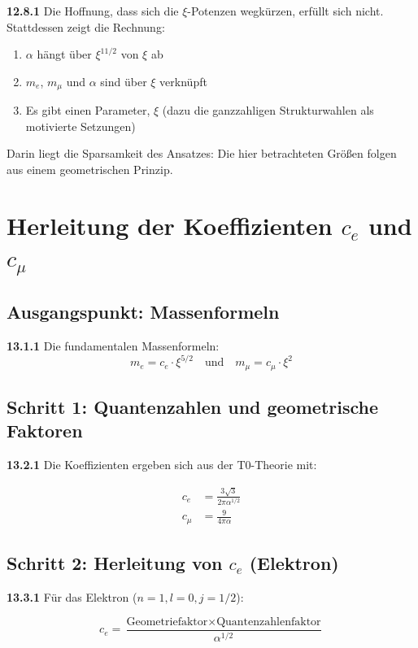 \noindent \textbf{12.8.1} Die Hoffnung, dass sich die $\xi$-Potenzen wegkürzen, erfüllt sich nicht. Stattdessen zeigt die Rechnung:

\begin{enumerate}
	\item $\alpha$ hängt über $\xi^{11/2}$ von $\xi$ ab
	\item $m_e$, $m_\mu$ und $\alpha$ sind über $\xi$ verknüpft
	\item Es gibt einen Parameter, $\xi$ (dazu die ganzzahligen Strukturwahlen als motivierte Setzungen)
\end{enumerate}

Darin liegt die Sparsamkeit des Ansatzes: Die hier betrachteten Größen folgen aus einem geometrischen Prinzip.


\section{Herleitung der Koeffizienten $c_e$ und $c_\mu$}

\subsection{Ausgangspunkt: Massenformeln}

\noindent \textbf{13.1.1} Die fundamentalen Massenformeln:
\[
m_e = c_e \cdot \xi^{5/2} \quad \text{und} \quad m_\mu = c_\mu \cdot \xi^2
\]

\subsection{Schritt 1: Quantenzahlen und geometrische Faktoren}

\noindent \textbf{13.2.1} Die Koeffizienten ergeben sich aus der T0-Theorie mit:

\begin{align*}
	c_e &= \frac{3\sqrt{3}}{2\pi\alpha^{1/2}} \\
	c_\mu &= \frac{9}{4\pi\alpha}
\end{align*}

\subsection{Schritt 2: Herleitung von $c_e$ (Elektron)}

\noindent \textbf{13.3.1} Für das Elektron ($n=1, l=0, j=1/2$):

\[
c_e = \frac{\text{Geometriefaktor} \times \text{Quantenzahlenfaktor}}{\alpha^{1/2}}
\]

